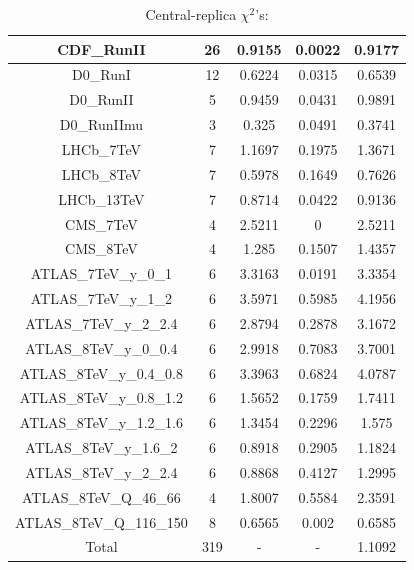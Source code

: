 \documentclass[
]{article}
\begin{document}
\begin{table}[h]
\begin{tabular}{|c|c|c|c|c|}
CDF\_RunII & 26 & 0.9155 & 0.0022 & 0.9177 \\ \hline
D0\_RunI & 12 & 0.6224 & 0.0315 & 0.6539 \\ \hline
D0\_RunII & 5 & 0.9459 & 0.0431 & 0.9891 \\ \hline
D0\_RunIImu & 3 & 0.325 & 0.0491 & 0.3741 \\ \hline
LHCb\_7TeV & 7 & 1.1697 & 0.1975 & 1.3671 \\ \hline
LHCb\_8TeV & 7 & 0.5978 & 0.1649 & 0.7626 \\ \hline
LHCb\_13TeV & 7 & 0.8714 & 0.0422 & 0.9136 \\ \hline
CMS\_7TeV & 4 & 2.5211 & 0 & 2.5211 \\ \hline
CMS\_8TeV & 4 & 1.285 & 0.1507 & 1.4357 \\ \hline
ATLAS\_7TeV\_y\_0\_1 & 6 & 3.3163 & 0.0191 & 3.3354 \\ \hline
ATLAS\_7TeV\_y\_1\_2 & 6 & 3.5971 & 0.5985 & 4.1956 \\ \hline
ATLAS\_7TeV\_y\_2\_2.4 & 6 & 2.8794 & 0.2878 & 3.1672 \\ \hline
ATLAS\_8TeV\_y\_0\_0.4 & 6 & 2.9918 & 0.7083 & 3.7001 \\ \hline
ATLAS\_8TeV\_y\_0.4\_0.8 & 6 & 3.3963 & 0.6824 & 4.0787 \\ \hline
ATLAS\_8TeV\_y\_0.8\_1.2 & 6 & 1.5652 & 0.1759 & 1.7411 \\ \hline
ATLAS\_8TeV\_y\_1.2\_1.6 & 6 & 1.3454 & 0.2296 & 1.575 \\ \hline
ATLAS\_8TeV\_y\_1.6\_2 & 6 & 0.8918 & 0.2905 & 1.1824 \\ \hline
ATLAS\_8TeV\_y\_2\_2.4 & 6 & 0.8868 & 0.4127 & 1.2995 \\ \hline
ATLAS\_8TeV\_Q\_46\_66 & 4 & 1.8007 & 0.5584 & 2.3591 \\ \hline
ATLAS\_8TeV\_Q\_116\_150 & 8 & 0.6565 & 0.002 & 0.6585 \\ \hline
Total & 319 & - & - & 1.1092 \\ \hline

\end{tabular}

\caption{Central-replica \(\chi^2\)'s:}

\end{table}
\end{document}
